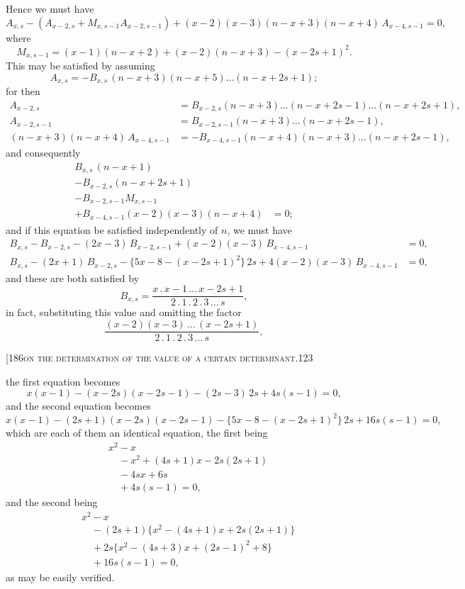 \documentclass[11pt]{article}
\begin{document}
\medskip
Hence we must have
\[
A_{x,s} - (A_{x-2,s} + M_{x,s-1} A_{x-2,s-1}) + (x-2)(x-3)(n-x+3)(n-x+4)\, A_{x-4,s-1} = 0,
\]
where
\[
M_{x,s-1} = (x-1)(n-x+2) + (x-2)(n-x+3) - (x-2s+1)^{2}.
\]
This may be satisfied by assuming
\[
A_{x,s} = -B_{x,s}\,(n-x+3)(n-x+5)\ldots(n-x+2s+1);
\]
for then
\[
\begin{aligned}
A_{x-2,s} &= B_{x-2,s}(n-x+3)\ldots(n-x+2s-1)\ldots(n-x+2s+1),\\
A_{x-2,s-1} &= B_{x-2,s-1}(n-x+3)\ldots(n-x+2s-1),\\
(n-x+3)(n-x+4)\, A_{x-4,s-1} &= -B_{x-4,s-1}(n-x+4)(n-x+3)\ldots(n-x+2s-1),
\end{aligned}
\]
and consequently
\[
\begin{aligned}
B_{x,s}\,(n-x+1)&\\
- B_{x-2,s}(n-x+2s+1) &\\
- B_{x-2,s-1} M_{x,s-1} &\\
+ B_{x-4,s-1}(x-2)(x-3)(n-x+4) &= 0;
\end{aligned}
\]
and if this equation be satisfied independently of $n$, we must have
\[
\begin{aligned}
B_{x,s} - B_{x-2,s} - (2x-3)\, B_{x-2,s-1} + (x-2)(x-3)\, B_{x-4,s-1} &= 0,\\
B_{x,s} - (2x+1)\, B_{x-2,s} - \{5x-8-(x-2s+1)^{2}\}\, 2s + 4(x-2)(x-3)\, B_{x-4,s-1} &= 0,
\end{aligned}
\]
and these are both satisfied by
\[
B_{x,s} = \frac{x\,.\,x-1\,\ldots\,x-2s+1}{2\,.\,1\,.\,2\,.\,3\,\ldots\,s},
\]
in fact, substituting this value and omitting the factor
\[
\frac{(x-2)(x-3)\,\ldots\,(x-2s+1)}{2\,.\,1\,.\,2\,.\,3\,\ldots\,s},
\]

\begin{center}\small[186\hfill\textsc{on the determination of the value of a certain determinant.}\hfill\textsc{123}\end{center}

\noindent the first equation becomes
\[
x(x-1) - (x-2s)(x-2s-1) - (2s-3)\,2s + 4s(s-1) = 0,
\]
and the second equation becomes
\[
x(x-1) - (2s+1)(x-2s)(x-2s-1) - \{5x-8-(x-2s+1)^{2}\}\, 2s + 16s(s-1) = 0,
\]
which are each of them an identical equation, the first being
\[
\begin{aligned}
& x^{2} - x\\
&\quad - x^{2} + (4s+1)x - 2s(2s+1)\\
&\quad - 4sx + 6s\\
&\quad + 4s(s-1) = 0,
\end{aligned}
\]
and the second being
\[
\begin{aligned}
& x^{2} - x\\
&\quad - (2s+1)\{x^{2} - (4s+1)x + 2s(2s+1)\}\\
&\quad + 2s\{x^{2} - (4s+3)x + (2s-1)^{2} + 8\}\\
&\quad + 16s(s-1) = 0,
\end{aligned}
\]
as may be easily verified.
\end{document}
